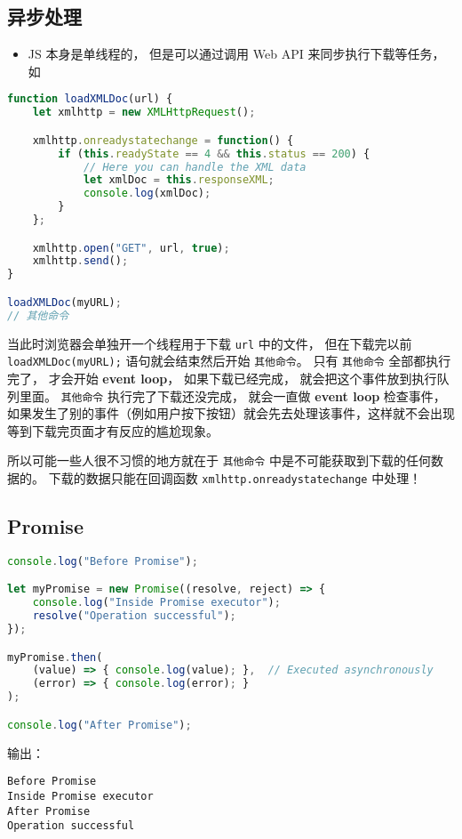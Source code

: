 

\begin{issues}
\issueDraft
\end{issues}


\subsection{异步处理}
\begin{itemize}
\item JS 本身是单线程的， 但是可以通过调用 Web API 来同步执行下载等任务， 如
\end{itemize}
\begin{lstlisting}[language=js]
function loadXMLDoc(url) {
    let xmlhttp = new XMLHttpRequest();

    xmlhttp.onreadystatechange = function() {
        if (this.readyState == 4 && this.status == 200) {
            // Here you can handle the XML data
            let xmlDoc = this.responseXML;
            console.log(xmlDoc);
        }
    };

    xmlhttp.open("GET", url, true);
    xmlhttp.send();
}

loadXMLDoc(myURL);
// 其他命令
\end{lstlisting}
当此时浏览器会单独开一个线程用于下载 \verb`url` 中的文件， 但在下载完以前 \verb`loadXMLDoc(myURL);` 语句就会结束然后开始 \verb`其他命令`。 只有 \verb`其他命令` 全部都执行完了， 才会开始 \textbf{event loop}， 如果下载已经完成， 就会把这个事件放到执行队列里面。 \verb`其他命令` 执行完了下载还没完成， 就会一直做 \textbf{event loop} 检查事件， 如果发生了别的事件（例如用户按下按钮）就会先去处理该事件，这样就不会出现等到下载完页面才有反应的尴尬现象。

所以可能一些人很不习惯的地方就在于 \verb`其他命令` 中是不可能获取到下载的任何数据的。 下载的数据只能在回调函数 \verb`xmlhttp.onreadystatechange` 中处理！

\subsection{Promise}
\begin{lstlisting}[language=js]
console.log("Before Promise");

let myPromise = new Promise((resolve, reject) => {
    console.log("Inside Promise executor");
    resolve("Operation successful");
});

myPromise.then(
    (value) => { console.log(value); },  // Executed asynchronously
    (error) => { console.log(error); }
);

console.log("After Promise");
\end{lstlisting}
输出：
\begin{lstlisting}[language=none]
Before Promise
Inside Promise executor
After Promise
Operation successful
\end{lstlisting}

